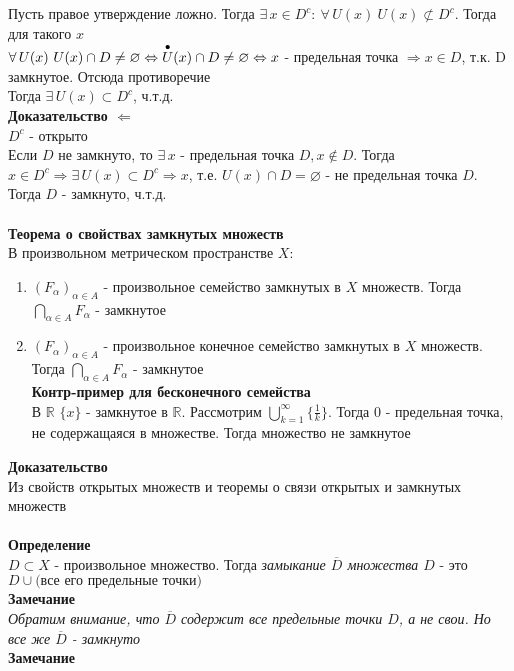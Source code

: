 \documentclass[12pt]{article}
\begin{document}
Пусть правое утверждение ложно. Тогда $\exists\,x\in D^c:\ \forall\,U(x)\ U(x)\not\subset D^c$. Тогда для такого $x$\\
$\forall\,U(x)\ U(x)\cap D \neq\varnothing \Leftrightarrow \overset{\bullet}{U}(x)\cap D \neq \varnothing \Leftrightarrow x$ - предельная точка $\Rightarrow x\in D$, т.к. D замкнутое. Отсюда противоречие\\
Тогда $\exists\,U(x) \subset D^c$, ч.т.д.\\
\textbf{Доказательство $\Leftarrow$}\\
$D^c$ - открыто\\
Если $D$ не замкнуто, то $\exists\,x$ - предельная точка $D, x\notin D$. Тогда $x\in D^c \Rightarrow \exists\, U(x)\subset D^c \Rightarrow x$, т.е. $U(x) \cap D = \varnothing$ - не предельная точка $D$. Тогда $D$ - замкнуто, ч.т.д.\\\\
\textbf{Теорема о свойствах замкнутых множеств}\\
В произвольном метрическом пространстве $X$:
\begin{enumerate}
    \item $(F_\alpha)_{\alpha \in A}$ - произвольное семейство замкнутых в $X$ множеств. Тогда $\bigcap_{\alpha \in A} F_\alpha$ - замкнутое
    \item $(F_\alpha)_{\alpha \in A}$ - произвольное конечное семейство замкнутых в $X$ множеств. Тогда $\bigcap_{\alpha \in A} F_\alpha$ - замкнутое\\
    \textbf{Контр-пример для бесконечного семейства}\\
    В $\mathbb{R}$ $\{x\}$ - замкнутое в $\mathbb{R}$. Рассмотрим $\bigcup_{k=1}^\infty \{\frac 1k\}$. Тогда $0$ - предельная точка, не содержащаяся в множестве. Тогда множество не замкнутое
\end{enumerate}
\textbf{Доказательство}\\
Из свойств открытых множеств и теоремы о связи открытых и замкнутых множеств\\\\
\textbf{Определение}\\
$D\subset X$ - произвольное множество. Тогда \textit{замыкание $\overline{D}$ множества $D$} - это $D\cup\text{(все его предельные точки)}$\\
\textbf{Замечание}\\
\textit{Обратим внимание, что $\overline{D}$ содержит все предельные точки $D$, а не свои. Но все же $\overline{D}$ - замкнуто}\\
\textbf{Замечание}
\end{document}
